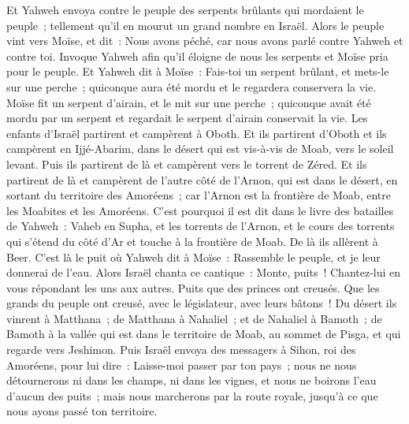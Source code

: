\begin{multicols}{2}
Et Yahweh envoya contre le peuple des serpents brûlants qui mordaient le peuple~; tellement qu'il en mourut un grand nombre en Israël.
Alors le peuple vint vers Moïse, et dit~: Nous avons péché, car nous avons parlé contre Yahweh et contre toi. Invoque Yahweh afin qu'il éloigne de nous les serpents et Moïse pria pour le peuple.
Et Yahweh dit à Moïse~: Fais-toi un serpent brûlant, et mets-le sur une perche~; quiconque aura été mordu et le regardera conservera la vie.
Moïse fit un serpent d'airain, et le mit sur une perche~; quiconque avait été mordu par un serpent et regardait le serpent d'airain conservait la vie.
Les enfants d'Israël partirent et campèrent à Oboth.
Et ils partirent d'Oboth et ils campèrent en Ijjé-Abarim, dans le désert qui est vis-à-vis de Moab, vers le soleil levant.
Puis ils partirent de là et campèrent vers le torrent de Zéred.
Et ils partirent de là et campèrent de l'autre côté de l'Arnon, qui est dans le désert, en sortant du territoire des Amoréens~; car l'Arnon est la frontière de Moab, entre les Moabites et les Amoréens.
C'est pourquoi il est dit dans le livre des batailles de Yahweh~: Vaheb en Supha, et les torrents de l'Arnon,
et le cours des torrents qui s'étend du côté d'Ar et touche à la frontière de Moab.
De là ils allèrent à Beer. C'est là le puit où Yahweh dit à Moïse~: Rassemble le peuple, et je leur donnerai de l'eau.
Alors Israël chanta ce cantique~: Monte, puits~! Chantez-lui en vous répondant les uns aux autres.
Puits que des princes ont creusés. Que les grands du peuple ont creusé, avec le législateur, avec leurs bâtons~! Du désert ils vinrent à Matthana~;
de Matthana à Nahaliel~; et de Nahaliel à Bamoth~;
de Bamoth à la vallée qui est dans le territoire de Moab, au sommet de Pisga, et qui regarde vers Jeshimon.
Puis Israël envoya des messagers à Sihon, roi des Amoréens, pour lui dire~:
Laisse-moi passer par ton pays~; nous ne nous détournerons ni dans les champs, ni dans les vignes, et nous ne boirons l'eau d'aucun des puits~; mais nous marcherons par la route royale, jusqu'à ce que nous ayons passé ton territoire.

\end{multicols}
